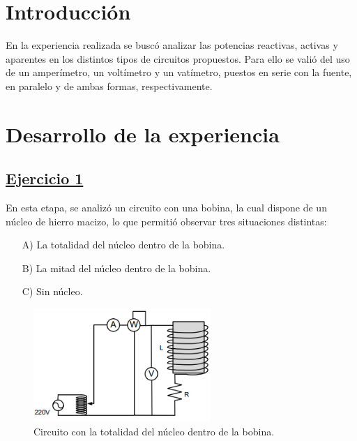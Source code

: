 \documentclass[a4paper]{article}
\begin{document}




\section*{Introducción}

En la experiencia realizada se buscó analizar las potencias reactivas, activas y aparentes en los distintos tipos de circuitos propuestos. Para ello se valió del uso de un amperímetro, un voltímetro y un vatímetro, puestos en serie con la fuente, en paralelo y de ambas formas, respectivamente.

\section*{Desarrollo de la experiencia}

\subsection*{\underline{Ejercicio 1}}

En esta etapa, se analizó un circuito con una bobina, la cual dispone de un núcleo de hierro macizo, lo que permitió observar tres situaciones distintas:
\begin{enumerate}
	\item[A)] La totalidad del núcleo dentro de la bobina.
	\item[B)] La mitad del núcleo dentro de la bobina.
	\item[C)] Sin núcleo.
\end{enumerate}

\begin{figure}[H]
	\centering
	\includegraphics[width=0.6\textwidth]{Circuito-ejercicio-1A}
	\caption{Circuito con la totalidad del núcleo dentro de la bobina.}
	\label{fig:1a}
\end{figure}
\end{document}
